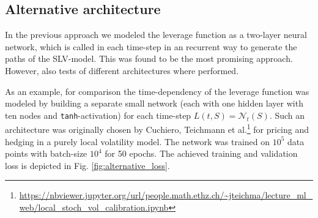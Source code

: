 \documentclass[
a4paper,     %
12pt           %
]{scrartcl}  %
\numberwithin{equation}{section}
\begin{document}
\subsection{Alternative architecture}
In the previous approach we modeled the leverage function as a two-layer neural network, which is called in each time-step in an recurrent way to generate the paths of the SLV-model. This was found to be the most promising approach. However, also tests of different architectures where performed.

As an example, for comparison the time-dependency of the leverage function was modeled by building a separate small network (each with one hidden layer with ten nodes and \texttt{tanh}-activation) for each time-step $L(t,S) = \mathcal{N}_t(S)$. Such an architecture was originally chosen by Cuchiero, Teichmann et al.\footnote{\url{https://nbviewer.jupyter.org/url/people.math.ethz.ch/~jteichma/lecture_ml_web/local_stoch_vol_calibration.ipynb}} for pricing and hedging in a purely local volatility model. The network was trained on $10^5$ data points with batch-size $10^4$ for 50 epochs. The achieved training and validation loss is depicted in Fig. \ref{fig:alternative_loss}.
\end{document}
